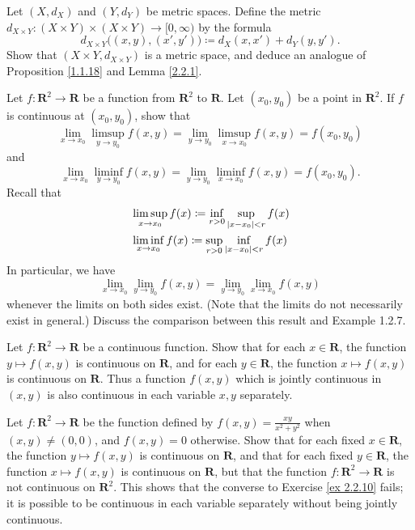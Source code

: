 \begin{exercise}\label{ex 2.2.8}
    Let \((X, d_X)\) and \((Y, d_Y)\) be metric spaces.
    Define the metric \(d_{X \times Y} : (X \times Y) \times (X \times Y) \to [0, \infty)\) by the formula
    \[
        d_{X \times Y}\big((x, y), (x', y')\big) \coloneqq d_X(x, x') + d_Y(y, y').
    \]
    Show that \((X \times Y, d_{X \times Y})\) is a metric space, and deduce an analogue of Proposition \ref{1.1.18} and Lemma \ref{2.2.1}.
\end{exercise}

\begin{exercise}\label{ex 2.2.9}
    Let \(f : \mathbf{R}^2 \to \mathbf{R}\) be a function from \(\mathbf{R}^2\) to \(\mathbf{R}\).
    Let \((x_0, y_0)\) be a point in \(\mathbf{R}^2\).
    If \(f\) is continuous at \((x_0, y_0)\), show that
    \[
        \lim_{x \to x_0} \limsup_{y \to y_0} f(x, y) = \lim_{y \to y_0} \limsup_{x \to x_0} f(x, y) = f(x_0, y_0)
    \]
    and
    \[
        \lim_{x \to x_0} \liminf_{y \to y_0} f(x, y) = \lim_{y \to y_0} \liminf_{x \to x_0} f(x, y) = f(x_0, y_0).
    \]
    Recall that
    \begin{align*}
         & \limsup_{x \to x_0} f(x) \coloneqq \inf_{r > 0} \sup_{\abs*{x - x_0} < r} f(x) \\
         & \liminf_{x \to x_0} f(x) \coloneqq \sup_{r > 0} \inf_{\abs*{x - x_0} < r} f(x)
    \end{align*}
    In particular, we have
    \[
        \lim_{x \to x_0} \lim_{y \to y_0} f(x, y) = \lim_{y \to y_0} \lim_{x \to x_0} f(x, y)
    \]
    whenever the limits on both sides exist.
    (Note that the limits do not necessarily exist in general.)
    Discuss the comparison between this result and Example 1.2.7.
\end{exercise}

\begin{exercise}\label{ex 2.2.10}
    Let \(f : \mathbf{R}^2 \to \mathbf{R}\) be a continuous function.
    Show that for each \(x \in \mathbf{R}\), the function \(y \mapsto f(x, y)\) is continuous on \(\mathbf{R}\), and for each \(y \in \mathbf{R}\), the function \(x \mapsto f(x, y)\) is continuous on \(\mathbf{R}\).
    Thus a function \(f(x, y)\) which is jointly continuous in \((x, y)\) is also continuous in each variable \(x, y\) separately.
\end{exercise}

\begin{exercise}\label{ex 2.2.11}
    Let \(f : \mathbf{R}^2 \to \mathbf{R}\) be the function defined by \(f(x, y) = \frac{xy}{x^2 + y^2}\) when \((x, y) \neq (0, 0)\), and \(f(x, y) = 0\) otherwise.
    Show that for each fixed \(x \in \mathbf{R}\), the function \(y \mapsto f(x, y)\) is continuous on \(\mathbf{R}\), and that for each fixed \(y \in \mathbf{R}\), the function \(x \mapsto f(x, y)\) is continuous on \(\mathbf{R}\), but that the function \(f : \mathbf{R}^2 \to \mathbf{R}\) is not continuous on \(\mathbf{R}^2\).
    This shows that the converse to Exercise \ref{ex 2.2.10} fails;
    it is possible to be continuous in each variable separately without being jointly continuous.
\end{exercise}

